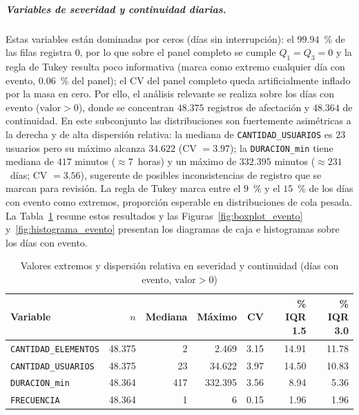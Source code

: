     \subparagraph{Variables de severidad y continuidad diarias.} Estas variables están dominadas por ceros (días sin interrupción): el $99{.}94$~\% de las filas registra $0$, por lo que sobre el panel completo se cumple $Q_1 = Q_3 = 0$ y la regla de Tukey resulta poco informativa (marca como extremo cualquier día con evento, $0{.}06$~\% del panel); el CV del panel completo queda artificialmente inflado por la masa en cero. Por ello, el análisis relevante se realiza sobre los días con evento ($\text{valor} > 0$), donde se concentran $48{.}375$ registros de afectación y $48{.}364$ de continuidad. En este subconjunto las distribuciones son fuertemente asimétricas a la derecha y de alta dispersión relativa: la mediana de \texttt{CANTIDAD\_USUARIOS} es $23$ usuarios pero su máximo alcanza $34{.}622$ (CV $= 3{.}97$); la \texttt{DURACION\_min} tiene mediana de $417$ minutos ($\approx 7$~horas) y un máximo de $332{.}395$ minutos ($\approx 231$~días; CV $= 3{.}56$), sugerente de posibles inconsistencias de registro que se marcan para revisión. La regla de Tukey marca entre el $9$~\% y el $15$~\% de los días con evento como extremos, proporción esperable en distribuciones de cola pesada. La Tabla~\ref{tab:extremos_evento} resume estos resultados y las Figuras~\ref{fig:boxplot_evento} y~\ref{fig:histograma_evento} presentan los diagramas de caja e histogramas sobre los días con evento.
    
    \begin{table}[!htbp]
    \centering
    \small
    \caption{Valores extremos y dispersión relativa en severidad y continuidad (días con evento, $\text{valor} > 0$)}
    \label{tab:extremos_evento}
    \begin{tabular}{l r r r r r r}
    \toprule
    \textbf{Variable} & \textbf{$n$} & \textbf{Mediana} & \textbf{Máximo} & \textbf{CV} & \textbf{\% IQR 1.5} & \textbf{\% IQR 3.0} \\
    \midrule
    \texttt{CANTIDAD\_ELEMENTOS} & 48{.}375 & 2   & 2{.}469   & 3.15 & 14.91 & 11.78 \\
    \texttt{CANTIDAD\_USUARIOS}  & 48{.}375 & 23  & 34{.}622  & 3.97 & 14.50 & 10.83 \\
    \texttt{DURACION\_min}  & 48{.}364 & 417 & 332{.}395 & 3.56 & 8.94  & 5.36  \\
    \texttt{FRECUENCIA}          & 48{.}364 & 1   & 6         & 0.15 & 1.96  & 1.96  \\
\bottomrule
    \end{tabular}
    \end{table}
    
